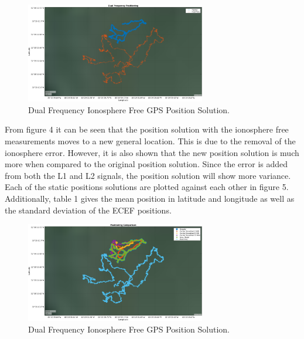 \documentclass[11pt]{article}
\begin{document}
\begin{enumerate}[label=\textbf{\arabic*.}]
     \begin{figure}[H]
        \centering
        \includegraphics[width=0.7\textwidth]{p1_d.png}
        \caption{Dual Frequency Ionosphere Free GPS Position Solution.}
    \end{figure}
From figure 4 it can be seen that the position solution with the ionosphere free measurements moves to a new general location. This is due to the removal of the ionosphere error. However, it is also shown that the new position solution is much more  when compared to the original position solution. Since the error is added from both the L1 and L2 signals, the position solution will show more variance. Each of the static positions solutions are plotted against each other in figure 5. Additionally, table 1 gives the mean position in latitude and longitude as well as the standard deviation of the ECEF positions.
    \begin{figure}[H]
        \centering
        \includegraphics[width=0.7\textwidth]{p1_f.png}
        \caption{Dual Frequency Ionosphere Free GPS Position Solution.}
    \end{figure}
    \break
       \begin{center}
            \begin{tabularx}{0.85\textwidth} { 
            | >{\centering\arraybackslash}X 
              | >{\centering\arraybackslash}X 
              | >{\centering\arraybackslash}X 
              | >{\centering\arraybackslash}X 
}
\end{tabularx}
\end{center}
\end{enumerate}
\end{document}
